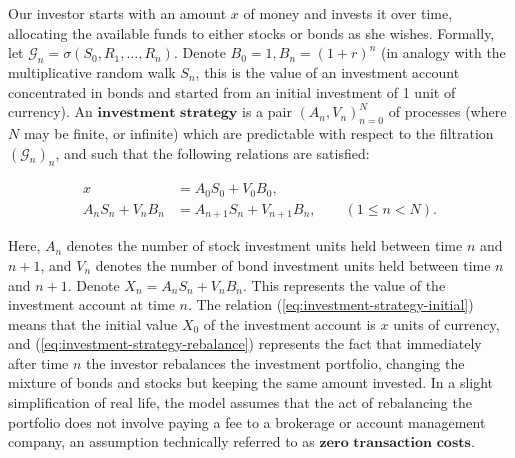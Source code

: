 \documentclass[11pt]{report}
\theoremstyle{plain}
\theoremstyle{definition}
\begin{document}
Our investor starts with an amount $x$ of money and invests it over time, allocating the available funds to either stocks or bonds as she wishes. Formally, let $\mathcal{G}_n = \sigma(S_0,R_1,\ldots,R_n)$. Denote $B_0=1, B_n=(1+r)^n$ (in analogy with the multiplicative random walk $S_n$, this is the value of an investment account concentrated in bonds and started from an initial investment of 1 unit of currency). An $\textbf{investment strategy}$ is a pair $(A_n, V_n)_{n=0}^N$ of processes (where $N$ may be finite, or infinite) which are predictable with respect to the filtration $(\mathcal{G}_n)_n$, and such that the following relations are satisfied:

\begin{align*}
x &= \tag{9}\label{eq:investment-strategy-initial} A_0 S_0 + V_0 B_0, \\
A_n S_n + V_n B_n &= \tag{10}\label{eq:investment-strategy-rebalance} A_{n+1} S_n + V_{n+1} B_n, \qquad (1\le n< N).
\end{align*}

Here, $A_n$ denotes the number of stock investment units held between time $n$ and $n+1$, and $V_n$ denotes the number of bond investment units held between time $n$ and $n+1$. Denote $X_n = A_n S_n + V_n B_n$. This represents the value of the investment account at time $n$. The relation (\ref{eq:investment-strategy-initial}) means that the initial value $X_0$ of the investment account is $x$ units of currency, and (\ref{eq:investment-strategy-rebalance}) represents the fact that immediately after time $n$ the investor rebalances the investment portfolio, changing the mixture of bonds and stocks but keeping the same amount invested. In a slight simplification of real life, the model assumes that the act of rebalancing the portfolio does not involve paying a fee to a brokerage or account management company, an assumption technically referred to as $\textbf{zero transaction costs}$.
\end{document}
